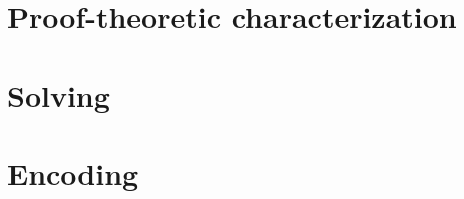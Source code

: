 \documentclass{article}
\begin{document}
\begin{refsection}
  \nocite{gekakasc12a}
  \nocite{lifschitz08a,lifschitz10a}
  \nocite{fitting02a}
  \nocite{fitting85a}
  \nocite{truszczynski18a}
  \nocite{lifschitz08a,lifschitz10a}
  \nocite{gerosc91a}
  \nocite{saczan90a,lee05a}
  \nocite{gerosc91a}
  \nocite{truszczynski18a}
  \printbibliography[heading=subbibliography]
\end{refsection}

\section{Proof-theoretic characterization}

\begin{refsection}
  \nocite{gekakasc12a}
  \nocite{lifschitz08a,lifschitz10a}
  \nocite{lifschitz08a,lifschitz10a}
  \nocite{TableauHandbook}

  \printbibliography[heading=subbibliography]
\end{refsection}

\section{Solving}

\begin{refsection}
  \nocite{gekasc09c}
  \nocite{lifschitz08a,lifschitz10a}
  \printbibliography[heading=subbibliography]
\end{refsection}

\section{Encoding}

\begin{refsection}
  \nocite{gekakasc11a}
  \printbibliography[heading=subbibliography]
\end{refsection}
\end{document}
